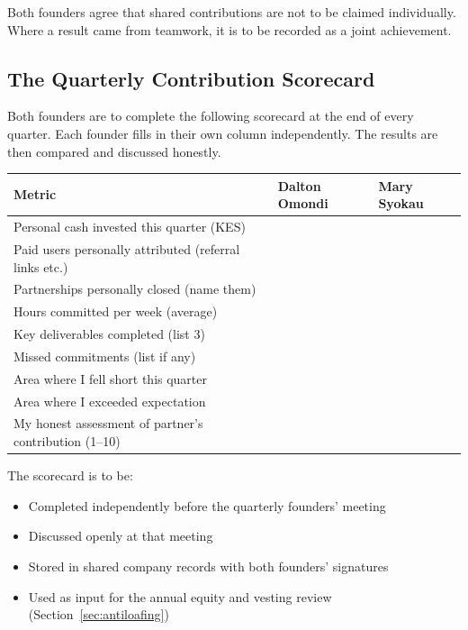 \documentclass[12pt,a4paper]{article}
\begin{document}
\noindent Both founders agree that shared contributions are not to be claimed individually. Where a result came from teamwork, it is to be recorded as a joint achievement.

\subsection{The Quarterly Contribution Scorecard}

Both founders are to complete the following scorecard at the end of every quarter. Each founder fills in their own column independently. The results are then compared and discussed honestly.

\begin{tabularx}{\linewidth}{L{5cm} X X}
  \toprule
  \textbf{Metric} & \textbf{Dalton Omondi} & \textbf{Mary Syokau} \\
  \midrule
  Personal cash invested this quarter (KES)              & & \\[0.4em]
  Paid users personally attributed (referral links etc.) & & \\[0.4em]
  Partnerships personally closed (name them)             & & \\[0.4em]
  Hours committed per week (average)                     & & \\[0.4em]
  Key deliverables completed (list 3)                    & & \\[0.4em]
  Missed commitments (list if any)                       & & \\[0.4em]
  Area where I fell short this quarter                   & & \\[0.4em]
  Area where I exceeded expectation                      & & \\[0.4em]
  My honest assessment of partner's contribution (1--10) & & \\
  \bottomrule
\end{tabularx}

\medskip
\noindent The scorecard is to be:
\begin{itemize}
  \item Completed independently before the quarterly founders' meeting
  \item Discussed openly at that meeting
  \item Stored in shared company records with both founders' signatures
  \item Used as input for the annual equity and vesting review (Section~\ref{sec:antiloafing})
\end{itemize}
\end{document}
